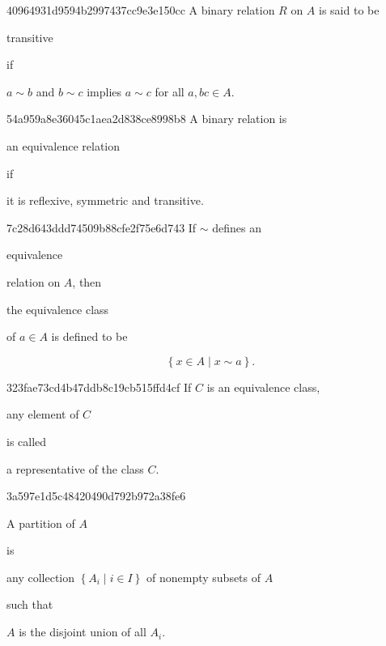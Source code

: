 \begin{note}{40964931d9594b2997437cc9e3e150cc}
    A binary relation \({ R }\) on \({ A }\) is said to be \begin{icloze}{2}transitive\end{icloze} if
    \begin{icloze}{1}
        \begin{center}
            \({ a \sim b }\) and \({ b \sim c }\) implies \({ a \sim c }\) for all \({ a, b c \in A }\).
        \end{center}
    \end{icloze}
\end{note}

\begin{note}{54a959a8e36045c1aea2d838ce8998b8}
    A binary relation is \begin{icloze}{2}an equivalence relation\end{icloze} if \begin{icloze}{1}it is reflexive, symmetric and transitive.\end{icloze}
\end{note}

\begin{note}{7c28d643ddd74509b88cfe2f75e6d743}
    If \({ \sim }\) defines an \begin{icloze}{3}equivalence\end{icloze} relation on \({ A }\), then \begin{icloze}{2}the equivalence class\end{icloze} of \({ a \in A }\) is defined to be
    \begin{icloze}{1}
        \[
            \left\{ x \in A \mid x \sim a \right\}.
        \]
    \end{icloze}
\end{note}

\begin{note}{323fae73cd4b47ddb8c19cb515ffd4cf}
    If \({ C }\) is an equivalence class, \begin{icloze}{2}any element of \({ C }\)\end{icloze} is called \begin{icloze}{1}a representative of the class \({ C }\).\end{icloze}
\end{note}

\begin{note}{3a597e1d5c48420490d792b972a38fe6}
    \begin{icloze}{2}A partition of \({ A }\)\end{icloze} is \begin{icloze}{3}any collection \({ \left\{ A_i \mid i \in I \right\} }\) of nonempty subsets of \({ A }\)\end{icloze} such that \begin{icloze}{1}\({ A }\) is the disjoint union of all \({ A_i }\).\end{icloze}
\end{note}

